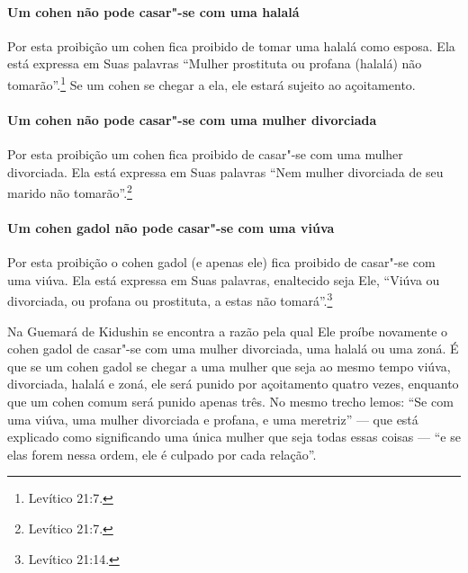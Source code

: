 \begin{multicols}{2}
\paragraph{Um cohen\starr{} não pode casar"-se com uma halalá\starr}

Por esta proibição um cohen\starr{} fica proibido de tomar uma
halalá\starr{} como esposa. Ela está expressa em Suas
palavras ``Mulher prostituta ou profana (halalá\starr) não tomarão''.\footnote{Levítico
21:7.} Se um cohen\starr{} se chegar a ela, ele estará sujeito ao
açoitamento.

\paragraph{Um cohen\starr{} não pode casar"-se com uma mulher divorciada}

Por esta proibição um cohen\starr{} fica proibido de casar"-se com uma mulher
divorciada. Ela está expressa em Suas palavras ``Nem mulher divorciada
de seu marido não tomarão''.\footnote{Levítico 21:7.}


\paragraph{Um cohen gadol\starr{} não pode casar"-se com uma viúva}

Por esta proibição o cohen gadol\starr{} (e apenas ele) fica proibido de
casar"-se com uma viúva. Ela está expressa em Suas palavras, enaltecido
seja Ele, ``Viúva ou divorciada, ou profana ou prostituta, a estas não
tomará''.\footnote{Levítico 21:14.}

Na Guemará\starr{} de Kidushin\starr{} se encontra a razão pela qual Ele proíbe
novamente o cohen gadol\starr{} de casar"-se com uma mulher divorciada, uma
halalá\starr{} ou uma zoná\starr. É que se um cohen gadol\starr{} se chegar a uma
mulher que seja ao mesmo tempo viúva, divorciada, halalá\starr{} e zoná\starr,
ele será punido por açoitamento quatro vezes, enquanto que um cohen\starr{}
comum será punido apenas três. No mesmo trecho lemos: ``Se com uma
viúva, uma mulher divorciada e profana, e uma meretriz'' --- que está
explicado como significando uma única mulher que seja todas essas
coisas --- ``e se elas forem nessa ordem, ele é culpado por cada
relação''.


\end{multicols}
